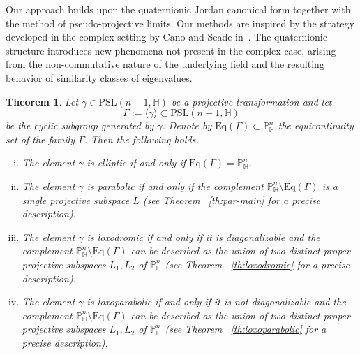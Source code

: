 \documentclass[12pt,reqno]{amsart}
\numberwithin{equation}{section}
\newtheorem{theorem}{Theorem}[section]
\theoremstyle{definition}
\begin{document}
Our approach builds upon the {quaternionic Jordan canonical form} together with the method of {pseudo-projective limits}. Our methods are inspired by the strategy developed in the complex setting by Cano and Seade in~\cite{can}. The quaternionic structure introduces new phenomena not present in the complex case, arising from the non-commutative nature of the underlying field and the resulting behavior of similarity classes of eigenvalues.
\begin{theorem}
Let $\gamma \in \mathrm{PSL}(n+1,\mathbb{H})$ be a projective transformation and let
\[
\Gamma := \langle \gamma \rangle \subset \mathrm{PSL}(n+1,\mathbb{H})
\]
be the cyclic subgroup generated by $\gamma$. Denote by $\mathrm{Eq}(\Gamma)\subset\mathbb{P}^n_{\mathbb{H}}$ the equicontinuity set of the family $\Gamma$. Then the following holds. 
\begin{enumerate}[(i)]
    \item The element $\gamma$ is \emph{elliptic} if and only if $\mathrm{Eq}(\Gamma)=\mathbb{P}^n_{\mathbb{H}}$.
    
    \item The element $\gamma$ is \emph{parabolic} if and only if the complement $\mathbb{P}^n_{\mathbb{H}}\setminus\mathrm{Eq}(\Gamma)$ is a single projective subspace $L$ (see Theorem ~\ref{th:par-main} for a precise description).
    
    \item The element $\gamma$ is \emph{loxodromic} if and only if it is diagonalizable and the complement $\mathbb{P}^n_{\mathbb{H}}\setminus\mathrm{Eq}(\Gamma)$ can be described as the union of two distinct proper projective subspaces $L_1, L_2$ of $\mathbb{P}^n_{\mathbb{H}}$ (see Theorem ~\ref{th:loxodromic} for a precise description).
    
    \item The element $\gamma$ is \emph{loxoparabolic} if and only if it is not diagonalizable and the complement $\mathbb{P}^n_{\mathbb{H}}\setminus\mathrm{Eq}(\Gamma)$ can be described as the union of two distinct proper projective subspaces $L_1, L_2$ of $\mathbb{P}^n_{\mathbb{H}}$ (see Theorem ~\ref{th:loxoparabolic} for a precise description).
\end{enumerate}
\end{theorem}
\end{document}
